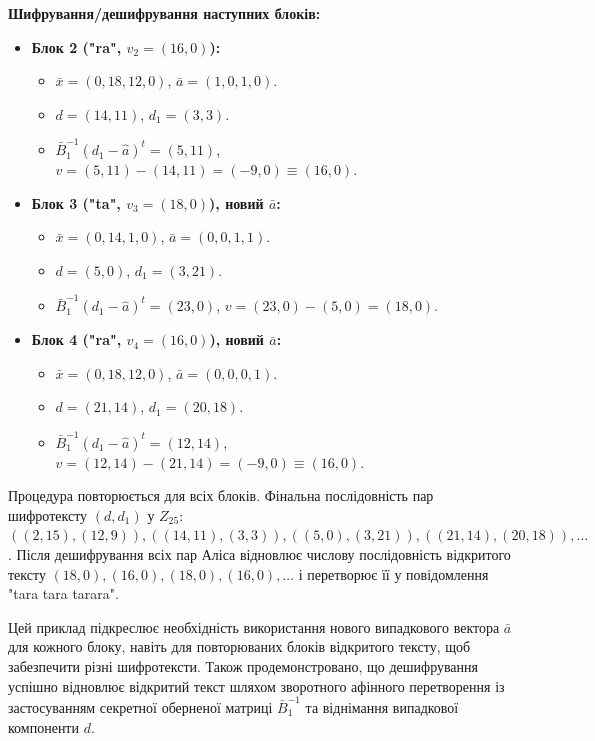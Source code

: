 \textbf{Шифрування/дешифрування наступних блоків:}
\begin{itemize}
    \item \textbf{Блок 2 ("ra", $v_2=(16,0)$):}
    \begin{itemize}
        \item $\bar{x}=(0,18,12,0)$, $\bar{a}=(1,0,1,0)$.
        \item $d=(14,11)$, $d_1=(3,3)$.
        \item $\bar{B}_1^{-1}(d_1-\hat{a})^t = (5,11)$, $v = (5,11)-(14,11) = (-9,0) \equiv (16,0)$.
    \end{itemize}
    \item \textbf{Блок 3 ("ta", $v_3=(18,0)$), новий $\bar{a}$:}
    \begin{itemize}
        \item $\bar{x}=(0,14,1,0)$, $\bar{a}=(0,0,1,1)$.
        \item $d=(5,0)$, $d_1=(3,21)$.
        \item $\bar{B}_1^{-1}(d_1-\hat{a})^t = (23,0)$, $v = (23,0)-(5,0) = (18,0)$.
    \end{itemize}
    \item \textbf{Блок 4 ("ra", $v_4=(16,0)$), новий $\bar{a}$:}
    \begin{itemize}
        \item $\bar{x}=(0,18,12,0)$, $\bar{a}=(0,0,0,1)$.
        \item $d=(21,14)$, $d_1=(20,18)$.
        \item $\bar{B}_1^{-1}(d_1-\hat{a})^t = (12,14)$, $v = (12,14)-(21,14) = (-9,0) \equiv (16,0)$.
    \end{itemize}
\end{itemize}
Процедура повторюється для всіх блоків.
Фінальна послідовність пар шифротексту $(d, d_1)$ у $Z_{25}$: $((2,15), (12,9)), ((14,11), (3,3)), ((5,0), (3,21)), ((21,14), (20,18)), \ldots$.
Після дешифрування всіх пар Аліса відновлює числову послідовність відкритого тексту $(18,0), (16,0), (18,0), (16,0), \ldots$ і перетворює її у повідомлення "tara tara tarara".

Цей приклад підкреслює необхідність використання нового випадкового вектора $\bar{a}$ для кожного блоку, навіть для повторюваних блоків відкритого тексту, щоб забезпечити різні шифротексти.
Також продемонстровано, що дешифрування успішно відновлює відкритий текст шляхом зворотного афінного перетворення із застосуванням секретної оберненої матриці $\bar{B}_1^{-1}$ та віднімання випадкової компоненти $d$.


